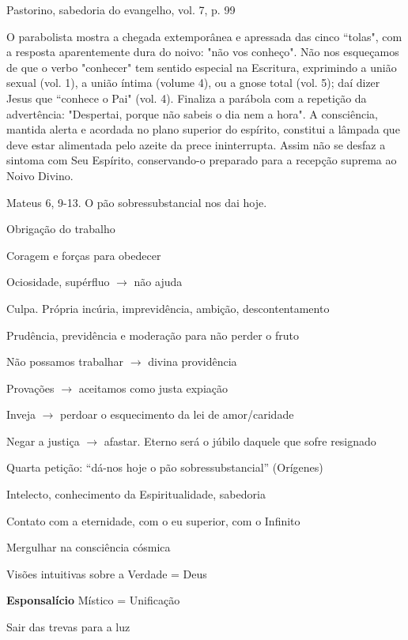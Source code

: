 \documentclass{rbfin}
\begin{document}
\begin{multicols}{2}
\dotfill

\newpage

Pastorino, sabedoria do evangelho, vol. 7, p. 99

O parabolista mostra a chegada extemporânea e apressada das cinco “tolas", com a resposta aparentemente dura do noivo: "não vos conheço". Não nos esqueçamos de que o verbo "conhecer" tem
sentido especial na Escritura, exprimindo a união sexual (vol. 1), a união íntima (volume 4), ou a
gnose total (vol. 5); daí dizer Jesus que “conhece o Pai" (vol. 4).
Finaliza a parábola com a repetição da advertência: "Despertai, porque não sabeis o dia nem a
hora". A consciência, mantida alerta e acordada no plano superior do espírito, constitui a lâmpada
que deve estar alimentada pelo azeite da prece ininterrupta. Assim não se desfaz a sintoma com Seu
Espírito, conservando-o preparado para a recepção suprema ao Noivo Divino.

\dotfill

Mateus 6, 9-13. O pão sobressubstancial nos dai hoje.

Obrigação do trabalho

Coragem e forças para obedecer

Ociosidade, supérfluo $\rightarrow$ não ajuda

Culpa. Própria incúria, imprevidência, ambição, descontentamento

Prudência, previdência e moderação para não perder o fruto

Não possamos trabalhar $\rightarrow$ divina providência

Provações $\rightarrow$ aceitamos como justa expiação

Inveja $\rightarrow$ perdoar o esquecimento da lei de amor/caridade

\newpage

Negar a justiça $\rightarrow$ afastar. Eterno será o júbilo daquele que sofre resignado

Quarta petição: “dá-nos hoje o pão sobressubstancial” (Orígenes)

Intelecto, conhecimento da Espiritualidade, sabedoria

Contato com a eternidade, com o eu superior, com o Infinito

Mergulhar na consciência cósmica

Visões intuitivas sobre a Verdade = Deus

\textbf{Esponsalício} Místico = Unificação

Sair das trevas para a luz


\end{multicols}
\end{document}
